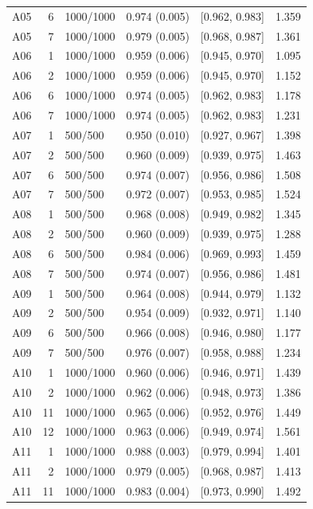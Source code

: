 \begin{longtable}[t]{lrllll}
A05 & 6 & 1000/1000 & 0.974 (0.005) & {}[0.962, 0.983] & 1.359\\
A05 & 7 & 1000/1000 & 0.979 (0.005) & {}[0.968, 0.987] & 1.361\\
A06 & 1 & 1000/1000 & 0.959 (0.006) & {}[0.945, 0.970] & 1.095\\
A06 & 2 & 1000/1000 & 0.959 (0.006) & {}[0.945, 0.970] & 1.152\\
A06 & 6 & 1000/1000 & 0.974 (0.005) & {}[0.962, 0.983] & 1.178\\
A06 & 7 & 1000/1000 & 0.974 (0.005) & {}[0.962, 0.983] & 1.231\\
A07 & 1 & 500/500 & 0.950 (0.010) & {}[0.927, 0.967] & 1.398\\
A07 & 2 & 500/500 & 0.960 (0.009) & {}[0.939, 0.975] & 1.463\\
A07 & 6 & 500/500 & 0.974 (0.007) & {}[0.956, 0.986] & 1.508\\
A07 & 7 & 500/500 & 0.972 (0.007) & {}[0.953, 0.985] & 1.524\\
A08 & 1 & 500/500 & 0.968 (0.008) & {}[0.949, 0.982] & 1.345\\
A08 & 2 & 500/500 & 0.960 (0.009) & {}[0.939, 0.975] & 1.288\\
A08 & 6 & 500/500 & 0.984 (0.006) & {}[0.969, 0.993] & 1.459\\
A08 & 7 & 500/500 & 0.974 (0.007) & {}[0.956, 0.986] & 1.481\\
A09 & 1 & 500/500 & 0.964 (0.008) & {}[0.944, 0.979] & 1.132\\
A09 & 2 & 500/500 & 0.954 (0.009) & {}[0.932, 0.971] & 1.140\\
A09 & 6 & 500/500 & 0.966 (0.008) & {}[0.946, 0.980] & 1.177\\
A09 & 7 & 500/500 & 0.976 (0.007) & {}[0.958, 0.988] & 1.234\\
A10 & 1 & 1000/1000 & 0.960 (0.006) & {}[0.946, 0.971] & 1.439\\
A10 & 2 & 1000/1000 & 0.962 (0.006) & {}[0.948, 0.973] & 1.386\\
A10 & 11 & 1000/1000 & 0.965 (0.006) & {}[0.952, 0.976] & 1.449\\
A10 & 12 & 1000/1000 & 0.963 (0.006) & {}[0.949, 0.974] & 1.561\\
A11 & 1 & 1000/1000 & 0.988 (0.003) & {}[0.979, 0.994] & 1.401\\
A11 & 2 & 1000/1000 & 0.979 (0.005) & {}[0.968, 0.987] & 1.413\\
A11 & 11 & 1000/1000 & 0.983 (0.004) & {}[0.973, 0.990] & 1.492\\

\end{longtable}
